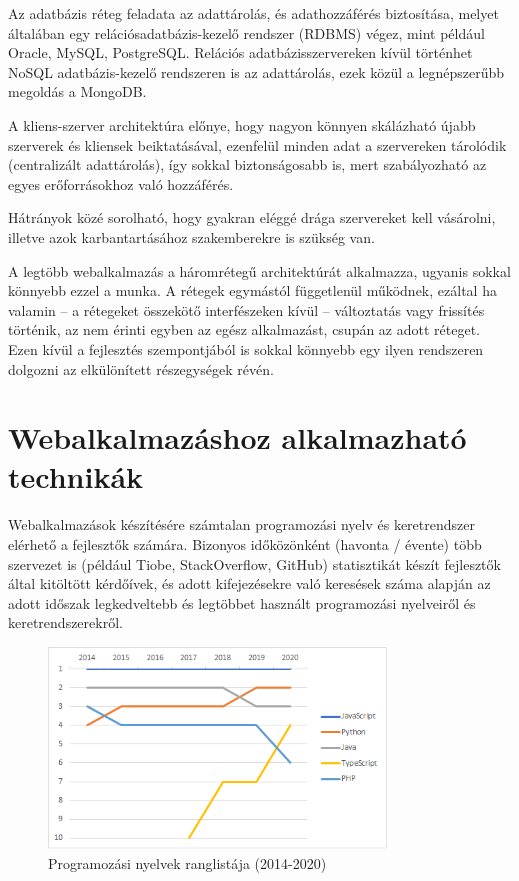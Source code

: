 \documentclass[
]{thesis-ekf}
\theoremstyle{definition}
\theoremstyle{remark}
\begin{document}
	Az adatbázis réteg feladata az adattárolás, és adathozzáférés biztosítása, melyet általában egy relációsadatbázis-kezelő rendszer (RDBMS) végez, mint például Oracle, MySQL, PostgreSQL. Relációs adatbázisszervereken kívül történhet NoSQL adatbázis-kezelő rendszeren is az adattárolás, ezek közül a legnépszerűbb megoldás a MongoDB.
	
	A kliens-szerver architektúra előnye, hogy nagyon könnyen skálázható újabb szerverek és kliensek beiktatásával, ezenfelül minden adat a szervereken tárolódik (centralizált adattárolás), így sokkal biztonságosabb is, mert szabályozható az egyes erőforrásokhoz való hozzáférés.
	
	Hátrányok közé sorolható, hogy gyakran eléggé drága szervereket kell vásárolni, illetve azok karbantartásához szakemberekre is szükség van.
	
	A legtöbb webalkalmazás a háromrétegű architektúrát alkalmazza, ugyanis sokkal könnyebb ezzel a munka. A rétegek egymástól függetlenül működnek, ezáltal ha valamin -- a rétegeket összekötő interfészeken kívül -- változtatás vagy frissítés történik, az nem érinti egyben az egész alkalmazást, csupán az adott réteget. Ezen kívül a fejlesztés szempontjából is sokkal könnyebb egy ilyen rendszeren dolgozni az elkülönített részegységek révén.
	
	\section{Webalkalmazáshoz alkalmazható technikák}
	Webalkalmazások készítésére számtalan programozási nyelv és keretrendszer elérhető a fejlesztők számára. Bizonyos időközönként (havonta / évente) több szervezet is (például Tiobe, StackOverflow\cite{stackoverflow_survey}, GitHub\cite{octoverse}) statisztikát készít fejlesztők által kitöltött kérdőívek, és adott kifejezésekre való keresések száma alapján az adott időszak legkedveltebb és legtöbbet használt programozási nyelveiről és keretrendszerekről.
	
	\begin{figure}[!ht]
		\centering
		\includegraphics[width=9cm]{kepek/octoverse_languages_ranking.png}
		\caption{Programozási nyelvek ranglistája (2014-2020)}
		\label{fig:ranglista}
	\end{figure}
	
\end{document}
